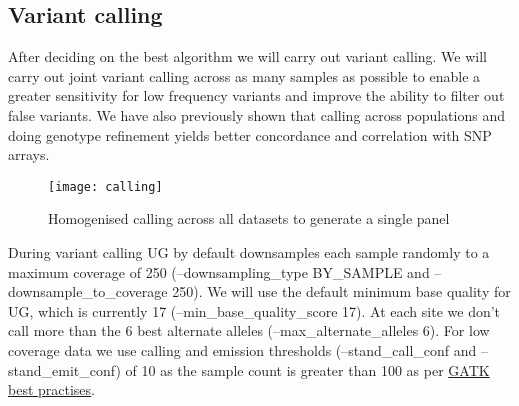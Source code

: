 \subsection{Variant calling}
After deciding on the best algorithm we will carry out variant calling. We will carry out joint variant calling across as many samples as possible to enable a greater sensitivity for low frequency variants and improve the ability to filter out false variants. We have also previously shown that calling across populations and doing genotype refinement yields better concordance and correlation with SNP arrays.

\begin{figure}[!htbp]
\centering
\texttt{[image: calling]}
\caption{Homogenised calling across all datasets to generate a single panel}
\label{fig:calling}
\end{figure}
During variant calling UG by default downsamples each sample randomly to a maximum coverage of 250 (--downsampling\_type BY\_SAMPLE and --downsample\_to\_coverage 250). We will use the default minimum base quality for UG, which is currently 17 (--min\_base\_quality\_score 17). %
At each site we don't call more than the 6 best alternate alleles (--max\_alternate\_alleles 6).
For low coverage data we use calling and emission thresholds (--stand\_call\_conf and --stand\_emit\_conf) of 10 as the sample count is greater than 100 as per \href{https://www.broadinstitute.org/gatk/guide/pdfdocs/GATK_GuideBook_2.7-4.pdf}{GATK best practises}.


